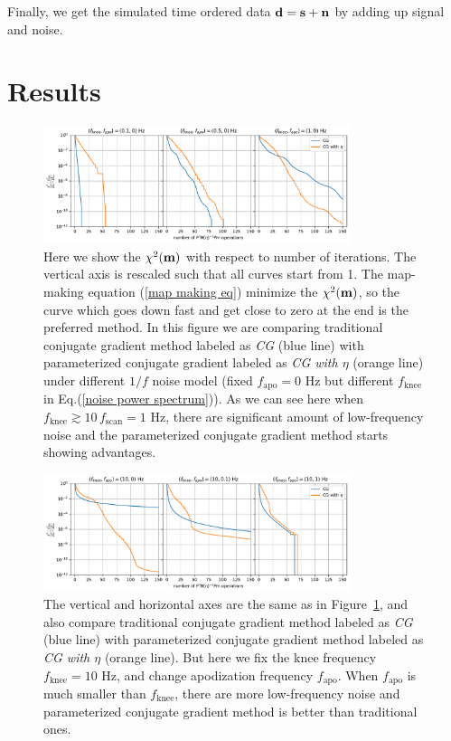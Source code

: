 \documentclass[twocolumn,linenumbers]{aastex631}
\newcommand{\vbm}{\vb{m}}
\begin{document}
Finally, we get the simulated time ordered data $\vb{d} = \vb{s} + \vb{n}$ by
adding up signal and noise.


\section{Results} \label{sec:results}

\begin{figure}[tb!]
\centering
\includegraphics[width=0.8\textwidth]{pink_noise_chi2.pdf}
\caption{
    Here we show the $\chi^2(\vbm)$ with respect to number of iterations.
    The vertical axis is rescaled  such that all curves start from 1.
    The map-making equation (\ref{map making eq}) minimize the $\chi^2(\vbm)$, so
    the curve which goes down fast and get close to zero at the end is the preferred method.
    In this figure we are comparing traditional conjugate gradient method labeled as \textit{CG} (blue line)
    with parameterized conjugate gradient labeled as \textit{CG with $\eta$} (orange line)
    under different $1/f$ noise model (fixed $f_\text{apo}=0$ Hz but different $f_\text{knee}$ in Eq.(\ref{noise power spectrum})).
    As we can see here when $f_\text{knee} \gtrsim 10\,f_\text{scan} = 1$ Hz, there are significant amount of
    low-frequency noise and the parameterized conjugate gradient method starts showing advantages.
}
\label{1/f noise chi2}
\end{figure}

\begin{figure}[tb!]
\centering
\includegraphics[width=0.8\textwidth]{flattened_noise_chi2.pdf}
\caption{
    The vertical and horizontal axes are the same as in Figure~\ref{1/f noise chi2},
    and also compare traditional conjugate gradient method labeled as \textit{CG} (blue line) 
    with parameterized conjugate gradient method labeled as \textit{CG with $\eta$} (orange line).
    But here we fix the knee frequency $f_\text{knee} = 10$ Hz, and change apodization frequency $f_\text{apo}$.
    When $f_\text{apo}$ is much smaller than $f_\text{knee}$, there are more low-frequency noise and
    parameterized conjugate gradient method is better than traditional ones.
}
\label{apo noise chi2}
\end{figure}
\end{document}
